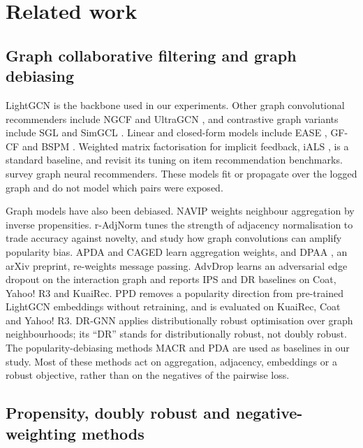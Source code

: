 \section{Related work}\label{sec:related}

\subsection{Graph collaborative filtering and graph debiasing}\label{sec:related-graph}

LightGCN \citep{he2020lightgcn} is the backbone used in our experiments. Other graph
convolutional recommenders include NGCF \citep{wang2019ngcf} and UltraGCN
\citep{mao2021ultragcn}, and contrastive graph variants include SGL \citep{wu2021sgl} and
SimGCL \citep{yu2022simgcl}. Linear and closed-form models include EASE \citep{steck2019ease},
GF-CF \citep{shen2021gfcf} and BSPM \citep{choi2023bspm}. Weighted matrix factorisation for
implicit feedback, iALS \citep{hu2008ials}, is a standard baseline, and \citet{rendle2022ials}
revisit its tuning on item recommendation benchmarks. \citet{wu2022gnnsurvey} survey graph
neural recommenders. These models fit or propagate over the logged graph and do not model
which pairs were exposed.

Graph models have also been debiased. NAVIP \citep{kim2022navip} weights neighbour
aggregation by inverse propensities. r-AdjNorm \citep{zhao2022radjnorm} tunes the strength of
adjacency normalisation to trade accuracy against novelty, and \citet{chen2024gcnpop} study
how graph convolutions can amplify popularity bias. APDA \citep{zhou2023apda} and CAGED
\citep{que2025caged} learn aggregation weights, and DPAA \citep{dpaa2026}, an arXiv preprint,
re-weights message passing. AdvDrop \citep{zhang2024advdrop} learns an adversarial edge dropout
on the interaction graph and reports IPS and DR baselines on Coat, Yahoo! R3 and KuaiRec. PPD
\citep{islam2026ppd} removes a popularity direction from pre-trained LightGCN embeddings
without retraining, and is evaluated on KuaiRec, Coat and Yahoo! R3. DR-GNN
\citep{wang2024drgnn} applies distributionally robust optimisation over graph neighbourhoods;
its ``DR'' stands for distributionally robust, not doubly robust. The popularity-debiasing
methods MACR \citep{wei2021macr} and PDA \citep{zhang2021pda} are used as baselines in our
study. Most of these methods act on aggregation, adjacency, embeddings or a robust objective,
rather than on the negatives of the pairwise loss.

\subsection{Propensity, doubly robust and negative-weighting methods}\label{sec:related-dr}

